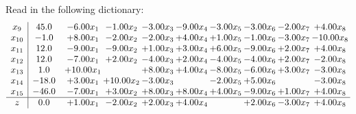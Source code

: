 \documentclass[9pt]{article}
\begin{document}
Read in the following dictionary:
\[\begin{array}{c| c c@{\hskip 2pt} c@{\hskip 2pt} c@{\hskip 2pt} c@{\hskip 2pt} c@{\hskip 2pt} c@{\hskip 2pt} c@{\hskip 2pt} c@{\hskip 2pt} }
 x_{9}   &  45.0 & -6.00 x_{1} & -1.00 x_{2} & -3.00 x_{3} & -9.00 x_{4} & -3.00 x_{5} & -3.00 x_{6} & -2.00 x_{7} & +  4.00 x_{8}\\
 x_{10}   &  -1.0 & +  8.00 x_{1} & -2.00 x_{2} & -2.00 x_{3} & +  4.00 x_{4} & +  1.00 x_{5} & -1.00 x_{6} & -3.00 x_{7} & -10.00 x_{8}\\
 x_{11}   &  12.0 & -9.00 x_{1} & -9.00 x_{2} & +  1.00 x_{3} & +  3.00 x_{4} & +  6.00 x_{5} & -9.00 x_{6} & +  2.00 x_{7} & +  4.00 x_{8}\\
 x_{12}   &  12.0 & -7.00 x_{1} & +  2.00 x_{2} & -4.00 x_{3} & +  2.00 x_{4} & -4.00 x_{5} & -4.00 x_{6} & +  2.00 x_{7} & -2.00 x_{8}\\
 x_{13}   &  1.0 & + 10.00 x_{1} &   & +  8.00 x_{3} & +  4.00 x_{4} & -8.00 x_{5} & -6.00 x_{6} & +  3.00 x_{7} & -3.00 x_{8}\\
 x_{14}   &  -18.0 & +  3.00 x_{1} & + 10.00 x_{2} & -3.00 x_{3} &   & -2.00 x_{5} & +  5.00 x_{6} &   & -3.00 x_{8}\\
 x_{15}   &  -46.0 & -7.00 x_{1} & +  3.00 x_{2} & +  8.00 x_{3} & +  8.00 x_{4} & +  4.00 x_{5} & -9.00 x_{6} & +  1.00 x_{7} & +  4.00 x_{8}\\
\hline
z    &  0.0 & +  1.00 x_{1} & -2.00 x_{2} & +  2.00 x_{3} & +  4.00 x_{4} &   & +  2.00 x_{6} & -3.00 x_{7} & +  4.00 x_{8}\\
\end{array}\]
\end{document}
